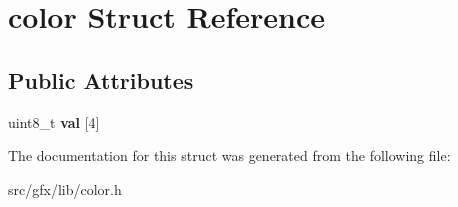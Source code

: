 \hypertarget{structcolor}{}\section{color Struct Reference}
\label{structcolor}
\subsection*{Public Attributes}
\begin{DoxyCompactItemize}
\item 
\mbox{\label{structcolor_a39141ffb9f9627e663bbd14e27feb15d}} 
uint8\+\_\+t {\bfseries val} \mbox{[}4\mbox{]}
\end{DoxyCompactItemize}


The documentation for this struct was generated from the following file\+:\begin{DoxyCompactItemize}
\item 
src/gfx/lib/color.\+h\end{DoxyCompactItemize}
